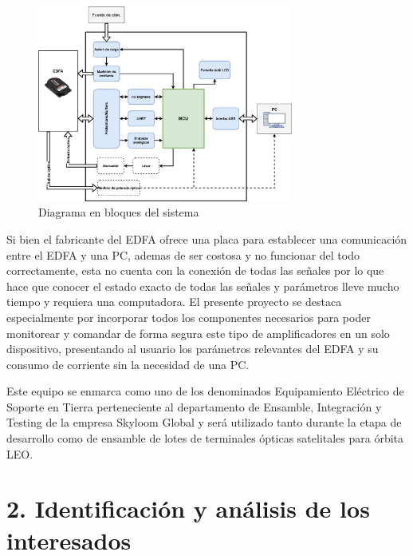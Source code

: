 \documentclass[
11pt, %
codirector, %
]{charter}
\begin{document}
\begin{figure}[H]
\centering 
\includegraphics[width=0.75\textwidth]{./Figuras/diagTester.jpg}
\caption{Diagrama en bloques del sistema}
\label{fig:diagTester}
\end{figure}


Si bien el fabricante del EDFA ofrece una placa para establecer una comunicación entre el EDFA y una PC, ademas de ser costosa y no funcionar del todo correctamente, esta no cuenta con la conexión de todas las señales por lo que hace que conocer el estado exacto de todas las señales y parámetros lleve mucho tiempo y requiera una computadora. El presente proyecto se destaca especialmente por incorporar todos los componentes necesarios para poder monitorear y comandar de forma segura este tipo de amplificadores en un solo dispositivo, presentando al usuario los parámetros relevantes del EDFA y su consumo de corriente sin la necesidad de una PC.

Este equipo se enmarca como uno de los denominados Equipamiento Eléctrico de Soporte en Tierra perteneciente al departamento de Ensamble, Integración y Testing de la empresa Skyloom Global y será utilizado tanto durante la etapa de desarrollo como de ensamble de lotes de terminales ópticas satelitales para órbita LEO.


\section{2. Identificación y análisis de los interesados}
\label{sec:interesados}
\end{document}
